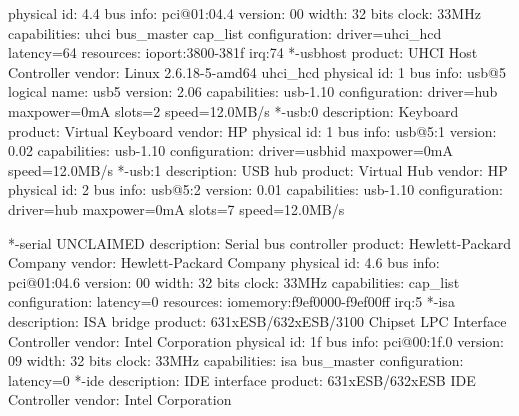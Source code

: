 \documentclass[mingoth,a4paper]{jsarticle}
\begin{document}
{{{{{{{{{{{{{{{{{{\begin{commandline}
                physical id: 4.4
                bus info: pci@01:04.4
                version: 00
                width: 32 bits
                clock: 33MHz
                capabilities: uhci bus_master cap_list
                configuration: driver=uhci_hcd latency=64
                resources: ioport:3800-381f irq:74
              *-usbhost
                   product: UHCI Host Controller
                   vendor: Linux 2.6.18-5-amd64 uhci_hcd
                   physical id: 1
                   bus info: usb@5
                   logical name: usb5
                   version: 2.06
                   capabilities: usb-1.10
                   configuration: driver=hub maxpower=0mA slots=2 speed=12.0MB/s
                 *-usb:0
                      description: Keyboard
                      product: Virtual Keyboard
                      vendor: HP
                      physical id: 1
                      bus info: usb@5:1
                      version: 0.02
                      capabilities: usb-1.10
                      configuration: driver=usbhid maxpower=0mA speed=12.0MB/s
                 *-usb:1
                      description: USB hub
                      product: Virtual Hub
                      vendor: HP
                      physical id: 2
                      bus info: usb@5:2
                      version: 0.01
                      capabilities: usb-1.10
                      configuration: driver=hub maxpower=0mA slots=7 speed=12.0MB/s
\end{commandline}
\begin{commandline}
           *-serial UNCLAIMED
                description: Serial bus controller
                product: Hewlett-Packard Company
                vendor: Hewlett-Packard Company
                physical id: 4.6
                bus info: pci@01:04.6
                version: 00
                width: 32 bits
                clock: 33MHz
                capabilities: cap_list
                configuration: latency=0
                resources: iomemory:f9ef0000-f9ef00ff irq:5
        *-isa
             description: ISA bridge
             product: 631xESB/632xESB/3100 Chipset LPC Interface Controller
             vendor: Intel Corporation
             physical id: 1f
             bus info: pci@00:1f.0
             version: 09
             width: 32 bits
             clock: 33MHz
             capabilities: isa bus_master
             configuration: latency=0
        *-ide
             description: IDE interface
             product: 631xESB/632xESB IDE Controller
             vendor: Intel Corporation

\end{commandline}}}}}}}}}}}}}}}}}}}
\end{document}
